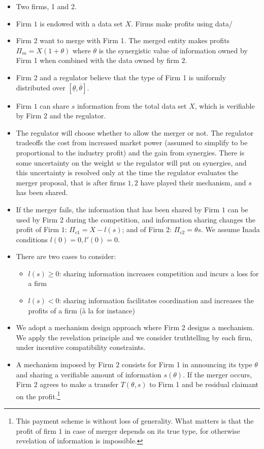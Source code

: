 \documentclass[a4paper]{article}
\renewcommand{\t}{\theta}
\begin{document}
\begin{itemize}
	\item Two firms, 1 and 2. 
	\item Firm $1$ is endowed with a data set $X$. Firms make profits using data/ 
	\item Firm 2 want to merge with Firm 1. The merged entity makes profits $\Pi_m=X(1+\t)$ where $\t$ is the synergistic value of information owned by Firm 1 when combined with the data owned by firm $2$. 
	\item Firm 2 and a regulator believe that the type of Firm 1 is uniformly distributed over $[\underline{\t},\overline{\t}]$.
    \item Firm $1$ can share $s$ information from the total data set $X$, which is verifiable by Firm $2$ and the regulator.
	\item The regulator will choose whether to allow the merger or not. The regulator tradeoffs the cost from increased market power (assumed to simplify to be proportional to the industry profit) and the gain from synergies. There is some uncertainty on the weight $w$ the regulator will put on synergies, and this uncertainty is resolved only at the time the regulator evaluates the merger proposal, that is after firms $1,2$ have played their mechanism, and $s$ has been shared.
	\item If the merger fails, the information that has been shared by Firm $1$ can be used by Firm 2 during the competition, and information sharing changes the profit of Firm $1$: $\Pi_{c1}=X-l(s)$; and of Firm 2: $\Pi_{c2}=\t s$. We assume Inada conditions $l(0)=0,l'(0)=0$.
	\item There are two cases to consider:
\begin{itemize}
    \item $l(s)\geq 0$: sharing information increases competition and incurs a loss for a firm
    \item $l(s)< 0$: sharing information facilitates coordination and increases the profits of a firm (à la \cite{vives1984duopoly} for instance)
 \end{itemize}
    \item We adopt a mechanism design approach where Firm 2 designs a mechanism. We apply the revelation principle and we consider truthtelling by each firm, under incentive compatibility constraints.
    \item A mechanism imposed by Firm 2 consists for Firm 1 in announcing its type $\t$ and sharing a verifiable amount of information $s(\t)$. If the merger occurs, Firm $2$ agrees to make a transfer  $T(\t,s)$ to Firm 1 and be residual claimant on the profit.\footnote{%
    This payment scheme is without loss of generality. What matters is that the profit of firm $1$ in case of merger depends on its true type, for otherwise revelation of information is impossible.}
    
\end{itemize}
\end{document}
